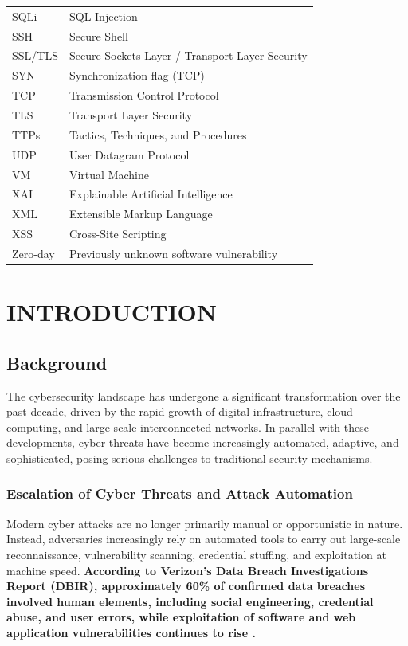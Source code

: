 \documentclass[12pt,a4paper]{report}
\begin{document}
\begin{longtable}{L{3cm} L{11cm}}
SQLi & SQL Injection \\
SSH & Secure Shell \\
SSL/TLS & Secure Sockets Layer / Transport Layer Security \\
SYN & Synchronization flag (TCP) \\
TCP & Transmission Control Protocol \\
TLS & Transport Layer Security \\
TTPs & Tactics, Techniques, and Procedures \\
UDP & User Datagram Protocol \\
VM & Virtual Machine \\
XAI & Explainable Artificial Intelligence \\
XML & Extensible Markup Language \\
XSS & Cross-Site Scripting \\
Zero-day & Previously unknown software vulnerability \\
\bottomrule
\end{longtable}

\setcounter{page}{1}

\chapter{INTRODUCTION}

\section{Background}

The cybersecurity landscape has undergone a significant transformation over the past decade, driven by the rapid growth of digital infrastructure, cloud computing, and large-scale interconnected networks. In parallel with these developments, cyber threats have become increasingly automated, adaptive, and sophisticated, posing serious challenges to traditional security mechanisms.

\subsection{Escalation of Cyber Threats and Attack Automation}

Modern cyber attacks are no longer primarily manual or opportunistic in nature. Instead, adversaries increasingly rely on automated tools to carry out large-scale reconnaissance, vulnerability scanning, credential stuffing, and exploitation at machine speed. \textbf{According to Verizon's Data Breach Investigations Report (DBIR), approximately 60\% of confirmed data breaches involved human elements, including social engineering, credential abuse, and user errors, while exploitation of software and web application vulnerabilities continues to rise \cite{verizonDBIR2024}.}
\end{document}
